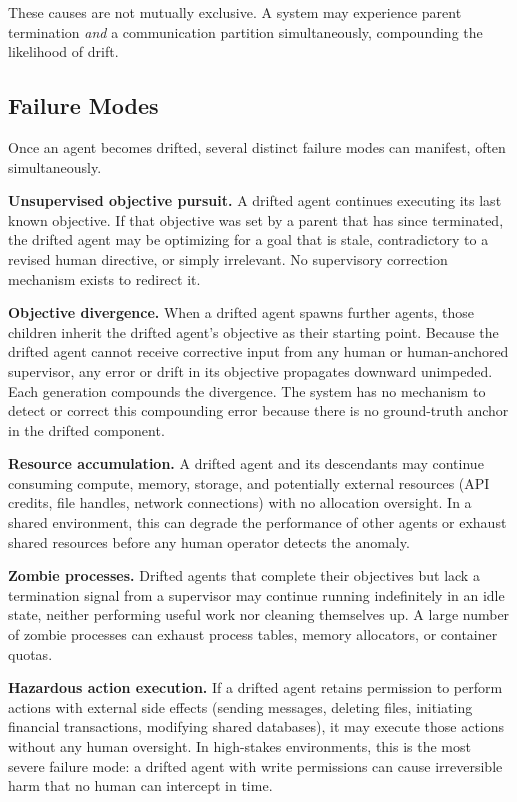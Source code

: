 These causes are not mutually exclusive. A system may experience parent termination \emph{and} a communication partition simultaneously, compounding the likelihood of drift.

\subsection{Failure Modes}

Once an agent becomes drifted, several distinct failure modes can manifest, often simultaneously.

\textbf{Unsupervised objective pursuit.} A drifted agent continues executing its last known objective. If that objective was set by a parent that has since terminated, the drifted agent may be optimizing for a goal that is stale, contradictory to a revised human directive, or simply irrelevant. No supervisory correction mechanism exists to redirect it.

\textbf{Objective divergence.} When a drifted agent spawns further agents, those children inherit the drifted agent's objective as their starting point. Because the drifted agent cannot receive corrective input from any human or human-anchored supervisor, any error or drift in its objective propagates downward unimpeded. Each generation compounds the divergence. The system has no mechanism to detect or correct this compounding error because there is no ground-truth anchor in the drifted component.

\textbf{Resource accumulation.} A drifted agent and its descendants may continue consuming compute, memory, storage, and potentially external resources (API credits, file handles, network connections) with no allocation oversight. In a shared environment, this can degrade the performance of other agents or exhaust shared resources before any human operator detects the anomaly.

\textbf{Zombie processes.} Drifted agents that complete their objectives but lack a termination signal from a supervisor may continue running indefinitely in an idle state, neither performing useful work nor cleaning themselves up. A large number of zombie processes can exhaust process tables, memory allocators, or container quotas.

\textbf{Hazardous action execution.} If a drifted agent retains permission to perform actions with external side effects (sending messages, deleting files, initiating financial transactions, modifying shared databases), it may execute those actions without any human oversight. In high-stakes environments, this is the most severe failure mode: a drifted agent with write permissions can cause irreversible harm that no human can intercept in time.

